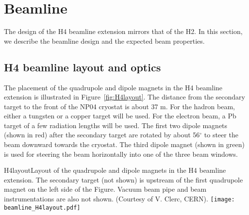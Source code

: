 \section{Beamline}
\label{sec:h4beamline}

The design of the H4 beamline extension mirrors that of the H2. In this section, we describe the beamline design and the expected beam properties.

\subsection{H4 beamline layout and optics}

The placement of the quadrupole and dipole magnets in the H4 beamline extension is illustrated in Figure~\ref{fig:H4layout}. The distance from the secondary target to the front of the NP04 cryostat is about 37 m. For the hadron beam, either a tungsten or a copper target will be used. For the electron beam, a Pb target of a few radiation lengths will be used. The first two dipole magnets (shown in red) after the secondary target are rotated by about 56$^\circ$ to steer the beam downward towards the cryostat. The third dipole magnet (shown in green) is used for steering the beam horizontally into one of the three beam windows. 

\begin{cdrfigure}{H4layout}{Layout of the quadrupole and dipole magnets in the H4 beamline extension. The secondary target (not shown) is upstream of the first quadrupole magnet on the left side of the Figure. Vacuum beam pipe and beam instrumentations are also not shown. (Courtesy of V. Clerc, CERN).}
  \texttt{[image: beamline\_H4layout.pdf]}
\end{cdrfigure}

